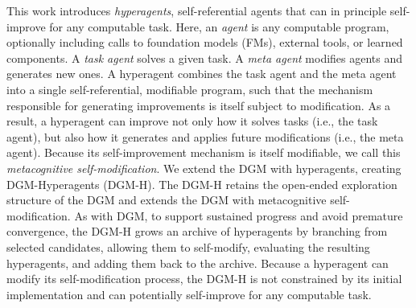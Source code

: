 \documentclass{article}
\begin{document}
This work introduces \textit{hyperagents}, self-referential agents that can in principle self-improve for any computable task. Here, an \textit{agent} is any computable program, optionally including calls to foundation models (FMs), external tools, or learned components. A \textit{task agent} solves a given task. A \textit{meta agent} modifies agents and generates new ones. A hyperagent combines the task agent and the meta agent into a single self-referential, modifiable program, such that the mechanism responsible for generating improvements is itself subject to modification. As a result, a hyperagent can improve not only how it solves tasks (i.e., the task agent), but also how it generates and applies future modifications (i.e., the meta agent). Because its self-improvement mechanism is itself modifiable, we call this \textit{metacognitive self-modification}.
We extend the DGM with hyperagents, creating DGM-Hyperagents (DGM-H). The DGM-H retains the open-ended exploration structure of the DGM and extends the DGM with metacognitive self-modification. As with DGM, to support sustained progress and avoid premature convergence, the DGM-H grows an archive of hyperagents by branching from selected candidates, allowing them to self-modify, evaluating the resulting hyperagents, and adding them back to the archive. Because a hyperagent can modify its self-modification process, the DGM-H is not constrained by its initial implementation and can potentially self-improve for any computable task.
\end{document}
